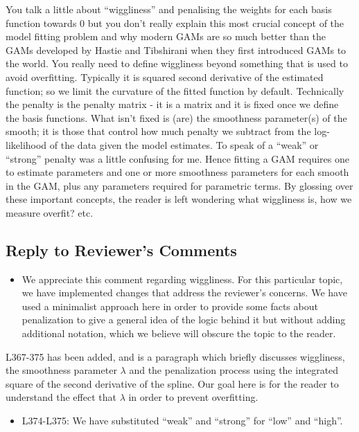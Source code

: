 \documentclass[
]{article}
\providecommand{\tightlist}{%
  \setlength{\itemsep}{0pt}\setlength{\parskip}{0pt}}
\begin{document}
You talk a little about ``wiggliness'' and penalising the weights for each basis function towards 0 but you don't really explain this most crucial concept of the model fitting problem and why modern GAMs are so much better than the GAMs developed by Hastie and Tibshirani when they first introduced GAMs to the world.
You really need to define wiggliness beyond something that is used to avoid overfitting. Typically it is squared second derivative of the estimated function; so we limit the curvature of the fitted function by default. Technically the penalty is the penalty matrix - it is a matrix and it is fixed once we define the basis functions. What isn't fixed is (are) the smoothness parameter(s) of the smooth; it is those that control how much penalty we subtract from the log-likelihood of the data given the model estimates. To speak of a ``weak'' or ``strong'' penalty was a little confusing for me.
Hence fitting a GAM requires one to estimate parameters and one or more smoothness parameters for each smooth in the GAM, plus any parameters required for parametric terms.
By glossing over these important concepts, the reader is left wondering what wiggliness is, how we measure overfit? etc.

\hypertarget{section-6}{%
\subsection{\texorpdfstring{\textcolor{reviewersblue} {Reply to Reviewer's Comments}}{}}\label{section-6}}

\begin{itemize}
\tightlist
\item
  We appreciate this comment regarding wiggliness. For this particular topic, we have implemented changes that address the reviewer's concerns. We have used a minimalist approach here in order to provide some facts about penalization to give a general idea of the logic behind it but without adding additional notation, which we believe will obscure the topic to the reader.
\end{itemize}

L367-375 has been added, and is a paragraph which briefly discusses wiggliness, the smoothness parameter \(\lambda\) and the penalization process using the integrated square of the second derivative of the spline. Our goal here is for the reader to understand the effect that \(\lambda\) in order to prevent overfitting.

\begin{itemize}
\tightlist
\item
  L374-L375: We have substituted ``weak'' and ``strong'' for ``low'' and ``high''.
\end{itemize}
\end{document}
